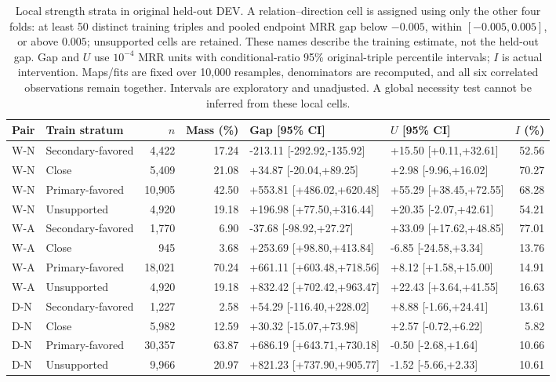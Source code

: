 \begin{table}[htbp]
\centering\footnotesize\setlength{\tabcolsep}{3pt}
\caption{Local strength strata in original held-out DEV. A relation--direction cell is assigned using only the other four folds: at least 50 distinct training triples and pooled endpoint MRR gap below $-0.005$, within $[-0.005,0.005]$, or above $0.005$; unsupported cells are retained. These names describe the training estimate, not the held-out gap. Gap and $U$ use $10^{-4}$ MRR units with conditional-ratio 95\% original-triple percentile intervals; $I$ is actual intervention. Maps/fits are fixed over 10,000 resamples, denominators are recomputed, and all six correlated observations remain together. Intervals are exploratory and unadjusted. A global necessity test cannot be inferred from these local cells.}
\label{tab:scope-dev}
\begin{tabular}{llrrllr}
\toprule
Pair & Train stratum & $n$ & Mass (\%) & Gap [95\% CI] & $U$ [95\% CI] & $I$ (\%)\\
\midrule
W-N & Secondary-favored & 4,422 & 17.24 & -213.11 [-292.92,-135.92] & +15.50 [+0.11,+32.61] & 52.56\\
W-N & Close & 5,409 & 21.08 & +34.87 [-20.04,+89.25] & +2.98 [-9.96,+16.02] & 70.27\\
W-N & Primary-favored & 10,905 & 42.50 & +553.81 [+486.02,+620.48] & +55.29 [+38.45,+72.55] & 68.28\\
W-N & Unsupported & 4,920 & 19.18 & +196.98 [+77.50,+316.44] & +20.35 [-2.07,+42.61] & 54.21\\
W-A & Secondary-favored & 1,770 & 6.90 & -37.68 [-98.92,+27.27] & +33.09 [+17.62,+48.85] & 77.01\\
W-A & Close & 945 & 3.68 & +253.69 [+98.80,+413.84] & -6.85 [-24.58,+3.34] & 13.76\\
W-A & Primary-favored & 18,021 & 70.24 & +661.11 [+603.48,+718.56] & +8.12 [+1.58,+15.00] & 14.91\\
W-A & Unsupported & 4,920 & 19.18 & +832.42 [+702.42,+963.47] & +22.43 [+3.64,+41.55] & 16.63\\
D-N & Secondary-favored & 1,227 & 2.58 & +54.29 [-116.40,+228.02] & +8.88 [-1.66,+24.41] & 13.61\\
D-N & Close & 5,982 & 12.59 & +30.32 [-15.07,+73.98] & +2.57 [-0.72,+6.22] & 5.82\\
D-N & Primary-favored & 30,357 & 63.87 & +686.19 [+643.71,+730.18] & -0.50 [-2.68,+1.64] & 10.66\\
D-N & Unsupported & 9,966 & 20.97 & +821.23 [+737.90,+905.77] & -1.52 [-5.66,+2.33] & 10.61\\

\end{tabular}
\end{table}
